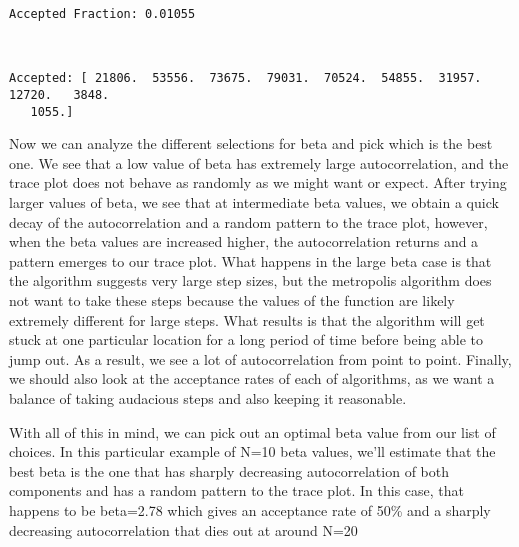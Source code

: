 \documentclass[11pt]{article}
\begin{document}
    \begin{Verbatim}[commandchars=\\\{\}]
Accepted Fraction: 0.01055

    \end{Verbatim}

    \begin{center}
    \end{center}
    { \hspace*{\fill} \\}
    
    \begin{Verbatim}[commandchars=\\\{\}]
Accepted: [ 21806.  53556.  73675.  79031.  70524.  54855.  31957.  12720.   3848.
   1055.]

    \end{Verbatim}

    Now we can analyze the different selections for beta and pick which is
the best one. We see that a low value of beta has extremely large
autocorrelation, and the trace plot does not behave as randomly as we
might want or expect. After trying larger values of beta, we see that at
intermediate beta values, we obtain a quick decay of the autocorrelation
and a random pattern to the trace plot, however, when the beta values
are increased higher, the autocorrelation returns and a pattern emerges
to our trace plot. What happens in the large beta case is that the
algorithm suggests very large step sizes, but the metropolis algorithm
does not want to take these steps because the values of the function are
likely extremely different for large steps. What results is that the
algorithm will get stuck at one particular location for a long period of
time before being able to jump out. As a result, we see a lot of
autocorrelation from point to point. Finally, we should also look at the
acceptance rates of each of algorithms, as we want a balance of taking
audacious steps and also keeping it reasonable.

With all of this in mind, we can pick out an optimal beta value from our
list of choices. In this particular example of N=10 beta values, we'll
estimate that the best beta is the one that has sharply decreasing
autocorrelation of both components and has a random pattern to the trace
plot. In this case, that happens to be beta=2.78 which gives an
acceptance rate of 50\% and a sharply decreasing autocorrelation that
dies out at around N=20
\end{document}
